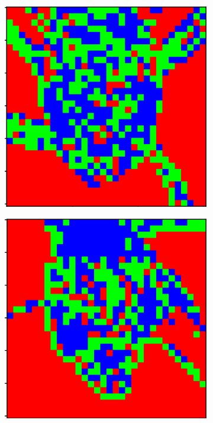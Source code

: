 \documentclass{aci}
\numberwithin{equation}{section}
\begin{document}
\begin{figure}
\begin{subfigure}{\segmentedsubwidth}
    \end{subfigure}
    \begin{subfigure}{\segmentedsubwidth}
        \includegraphics[width=1\linewidth]{figs/19/s105.png}
    \end{subfigure}
    \begin{subfigure}{\segmentedsubwidth}
        \includegraphics[width=1\linewidth]{figs/19/s107.png}

\end{subfigure}
\end{figure}
\end{document}
